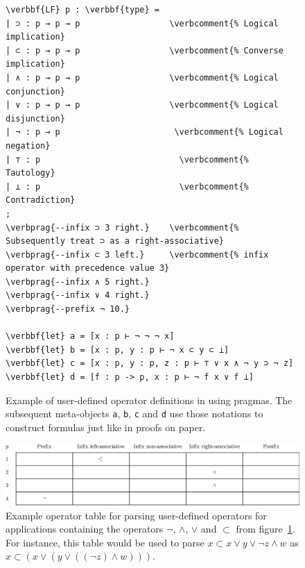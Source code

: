 \begin{figure}[!htb]
\begin{Verbatim}[commandchars=\\\{\}, baselinestretch=1]
\verbbf{LF} p : \verbbf{type} =
| ⊃ : p → p → p                  \verbcomment{% Logical implication}
| ⊂ : p → p → p                  \verbcomment{% Converse implication}
| ∧ : p → p → p                  \verbcomment{% Logical conjunction}
| ∨ : p → p → p                  \verbcomment{% Logical disjunction}
| ¬ : p → p                       \verbcomment{% Logical negation}
| ⊤ : p                            \verbcomment{% Tautology}
| ⊥ : p                            \verbcomment{% Contradiction}
;
\verbprag{--infix ⊃ 3 right.}    \verbcomment{% Subsequently treat ⊃ as a right-associative}
\verbprag{--infix ⊂ 3 left.}     \verbcomment{% infix operator with precedence value 3}
\verbprag{--infix ∧ 5 right.}
\verbprag{--infix ∨ 4 right.}
\verbprag{--prefix ¬ 10.}

\verbbf{let} a = [x : p ⊢ ¬ ¬ ¬ x]
\verbbf{let} b = [x : p, y : p ⊢ ¬ x ⊂ y ⊂ ⊥]
\verbbf{let} c = [x : p, y : p, z : p ⊢ ⊤ ∨ x ∧ ¬ y ⊃ ¬ z]
\verbbf{let} d = [f : p -> p, x : p ⊢ ¬ f x ∨ f ⊥]
\end{Verbatim}
\caption[Example of user-defined operator definitions in \Beluga using pragmas.]{%
Example of user-defined operator definitions in \Beluga using pragmas.
The subsequent meta-objects \texttt{a}, \texttt{b}, \texttt{c} and \texttt{d} use those notations to construct formulas just like in proofs on paper.
}
\label{figure:operator-pragmas}
\end{figure}

\begin{figure}
\includegraphics[width=\textwidth]{figures/operator-table.eps}
\caption[Example operator table for parsing user-defined operators.]{%
Example operator table for parsing user-defined operators for applications containing the operators $\lnot$, $\land$, $\lor$ and $\subset$ from figure~\ref{figure:operator-pragmas}.
For instance, this table would be used to parse $x \subset x \lor y \lor \lnot z \land w$ as $x \subset (x \lor (y \lor ((\lnot z) \land w)))$.
}
\label{figure:operator-table}
\end{figure}

